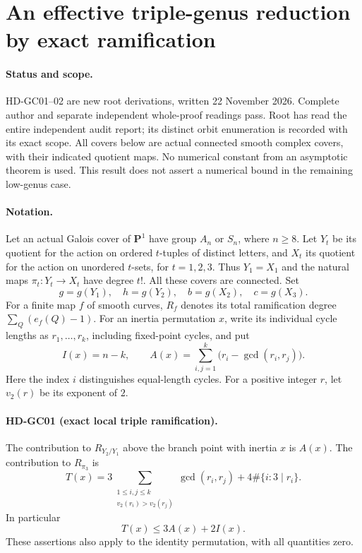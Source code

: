 \section{An effective triple-genus reduction by exact ramification}
\label{sec:projected-triple-ramification}

\paragraph{Status and scope.}
HD-GC01--02 are new root derivations, written 22 November 2026.
Complete author and separate independent whole-proof readings pass. Root has read the entire independent audit report; its distinct orbit enumeration is recorded with its exact scope. All covers below are actual
connected smooth complex covers, with their indicated quotient maps.
No numerical constant from an asymptotic theorem is used. This result
does not assert a numerical bound in the remaining low-genus case.

\paragraph{Notation.}
Let an actual Galois cover of $\mathbf P^1$ have group $A_n$ or $S_n$,
where $n\geq8$. Let $Y_t$ be its quotient for the action on ordered
$t$-tuples of distinct letters, and $X_t$ its quotient for the action on
unordered $t$-sets, for $t=1,2,3$. Thus $Y_1=X_1$ and the natural maps
$\pi_t:Y_t\longrightarrow X_t$ have degree $t!$. All these covers are
connected. Set
\[
 g=g(Y_1),\quad h=g(Y_2),\quad b=g(X_2),\quad c=g(X_3).
\]
For a finite map $f$ of smooth curves, $R_f$ denotes its total
ramification degree $\sum_Q(e_f(Q)-1)$. For an inertia permutation $x$,
write its individual cycle lengths as $r_1,\ldots,r_k$, including
fixed-point cycles, and put
\[
 I(x)=n-k,\qquad
 A(x)=\sum_{i,j=1}^k\bigl(r_i-\gcd(r_i,r_j)\bigr).
\]
Here the index $i$ distinguishes equal-length cycles. For a positive
integer $r$, let $v_2(r)$ be its exponent of $2$.

\paragraph{HD-GC01 (exact local triple ramification).}
The contribution to $R_{Y_2/Y_1}$ above the branch point with inertia
$x$ is $A(x)$. The contribution to $R_{\pi_3}$ is
\[
 T(x)=3\!\sum_{\substack{1\leq i,j\leq k\\v_2(r_i)>v_2(r_j)}}
           \gcd(r_i,r_j)
       +4\#\{i:3\mid r_i\}.
\]
In particular
\[
                    T(x)\leq3A(x)+2I(x).
\]
These assertions also apply to the identity permutation, with all
quantities zero.

